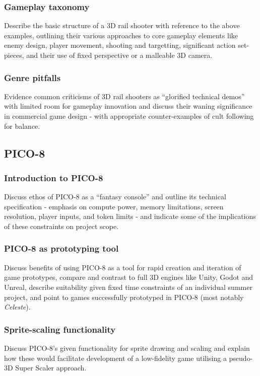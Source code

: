 \documentclass{article}
\begin{document}
\subsubsection*{Gameplay taxonomy}
Describe the basic structure of a 3D rail shooter with reference to the above examples,
outlining their various approaches to core gameplay elements like enemy design, player
movement, shooting and targetting, significant action set-pieces, and their use of
fixed perspective or a malleable 3D camera.
\subsubsection*{Genre pitfalls}
Evidence common criticisms of 3D rail shooters as ``glorified technical demos'' with
limited room for gameplay innovation and discuss their waning significance in
commercial game design - with appropriate counter-examples of cult following for
balance.

\subsection{PICO-8}
\subsubsection*{Introduction to PICO-8}
Discuss ethos of PICO-8 as a ``fantasy console'' and outline its technical
specification - emphasis on compute power, memory limitations, screen resolution,
player inputs, and token limits - and indicate some of the implications of these
constraints on project scope.
\subsubsection*{PICO-8 as prototyping tool}
Discuss benefits of using PICO-8 as a tool for rapid creation and iteration of
game prototypes, compare and contrast to full 3D engines like Unity, Godot and Unreal,
describe suitability given fixed time constraints of an individual summer
project, and point to games successfully prototyped in PICO-8 (most notably
\textit{Celeste}).
\subsubsection*{Sprite-scaling functionality}
Discuss PICO-8's given functionality for sprite drawing and scaling and explain how
these would facilitate development of a low-fidelity game utilising a pseudo-3D
Super Scaler approach.
\end{document}
